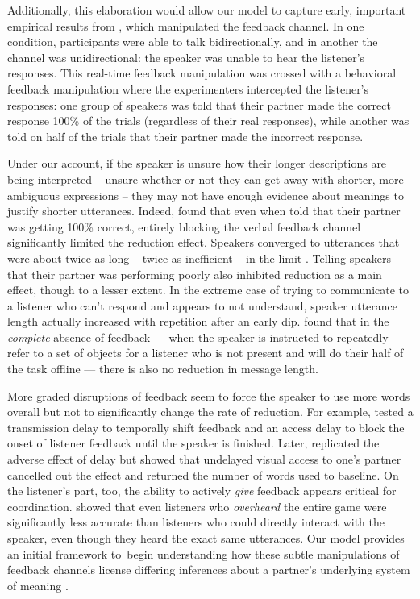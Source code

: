 Additionally, this elaboration would allow our model to capture early, important empirical results from , which manipulated the feedback channel.
In one condition, participants were able to talk bidirectionally, and in another the channel was unidirectional: the speaker was unable to hear the listener's responses. 
This real-time feedback manipulation was crossed with a behavioral feedback manipulation where the experimenters intercepted the listener's responses: one group of speakers was told that their partner made the correct response 100\% of the trials (regardless of their real responses), while another was told on half of the trials that their partner made the incorrect response. 

Under our account, if the speaker is unsure how their longer descriptions are being interpreted -- unsure whether or not they can get away with shorter, more ambiguous expressions -- they may not have enough evidence about meanings to justify shorter utterances. 
Indeed,  found that even when told that their partner was getting 100\% correct, entirely blocking the verbal feedback channel significantly limited the reduction effect. 
Speakers converged to utterances that were about twice as long -- twice as inefficient -- in the limit . 
Telling speakers that their partner was performing poorly also inhibited reduction as a main effect, though to a lesser extent. 
In the extreme case of trying to communicate to a listener who can't respond and appears to not understand, speaker utterance length actually increased with repetition after an early dip. 
 found that in the \emph{complete} absence of feedback --- when the speaker is instructed to repeatedly refer to a set of objects for a listener who is not present and will do their half of the task offline --- there is also no reduction in message length. 

More graded disruptions of feedback seem to force the speaker to use more words overall but not to significantly change the rate of reduction. 
For example,  tested a transmission delay to temporally shift feedback and an access delay to block the onset of listener feedback until the speaker is finished. 
Later,  replicated the adverse effect of delay but showed that undelayed visual access to one's partner cancelled out the effect and returned the number of words used to baseline. 
On the listener's part, too, the ability to actively \emph{give} feedback appears critical for coordination. 
 showed that even listeners who \emph{overheard} the entire game were significantly less accurate than listeners who could directly interact with the speaker, even though they heard the exact same utterances.
Our model provides an initial framework to begin understanding how these subtle manipulations of feedback channels license differing inferences about a partner's underlying system of meaning .

